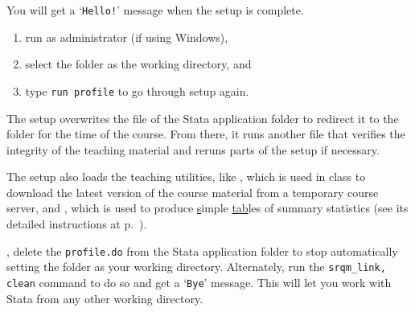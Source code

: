 	You will get a `\texttt{Hello!}' message when the setup is complete.%
	
		\begin{enumerate}
			\item run as administrator (if using Windows),
			\item select the \SRQM folder as the working directory, and
			\item type \texttt{run profile} to go through setup again.
		\end{enumerate}
	  
	The setup overwrites the  file of the Stata application folder to redirect it to the \SRQM folder for the time of the course. From there, it runs another  file that verifies the integrity of the teaching material and reruns parts of the setup if necessary.%
		
	The setup also loads the  teaching utilities, like , which is used in class to download the latest version of the course material from a temporary course server, and , which is used to produce \underline{s}imple \underline{tab}les of summary statistics (see its detailed instructions at p.~\pageref{cmd:stab}).%
		
  , delete the \texttt{profile.do} from the Stata application folder to stop automatically setting the \SRQM folder as your working directory. Alternately, run the \texttt{srqm\_link, clean} command to do so and get a `\texttt{Bye}' message. This will let you work with Stata from any other working directory.%
